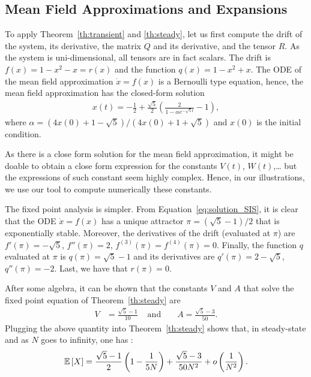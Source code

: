 \documentclass[sigconf]{acmart}
\newcommand\esp[1]{{\mathchoice{\besp{#1}}{\sesp{#1}}{\sesp{#1}}{\sesp{#1}}}}
\newcommand\besp[1]{\mathbb{E}\left[#1\right]}
\newcommand\sesp[1]{\mathbb{E}[#1]}
\newcommand\p[1]{\left(#1\right)}
\begin{document}
\subsection{Mean Field Approximations and Expansions}

To apply Theorem~\ref{th:transient} and \ref{th:steady}, let us first
compute the drift of the system, its derivative, the matrix $Q$
and its derivative, and the tensor $R$. As the system is
uni-dimensional, all tensors are in fact scalars. The drift is
$f(x)=1-x^2-x=r(x)$ and the function $q(x)=1-x^2+x$. The ODE of the
mean field approximation $\dot{x}=f(x)$ is a Bernoulli type equation,
hence, the mean field approximation has the closed-form solution
\begin{align}
  \label{eq:solution_SIS}
  x(t)=-\frac12+\frac{\sqrt{5}}{2}\p{\frac2{1-\alpha e^{-\sqrt{5}t}}-1},
\end{align}
where $\alpha=(4x(0)+1-\sqrt{5})/(4x(0)+1+\sqrt{5})$ and $x(0)$ is the initial condition.

As there is a close form solution for the mean field approximation, it
might be doable to obtain a close form expression for the constants
$V(t)$, $W(t)$,\dots{} but the expressions of such constant seem
highly complex. Hence, in our illustrations, we use our tool
\cite{rmfTool2018} to compute numerically these constants. 


The fixed point analysis is simpler.  From
Equation~\eqref{eq:solution_SIS}, it is clear that the ODE
$\dot{x}=f(x)$ has a unique attractor $\pi=(\sqrt{5}-1)/2$ that is
exponentially stable. Moreover, the derivatives of the drift (evaluated
at $\pi$) are $f'(\pi)=-\sqrt{5}$, $f''(\pi)=2$,
$f^{(3)}(\pi)=f^{(4)}(\pi)=0$. Finally, the function $q$ evaluated at
$\pi$ is $q(\pi)=\sqrt{5}-1$ and its derivatives are
$q'(\pi)=2-\sqrt{5}$, $q''(\pi)=-2$. Last, we have that $r(\pi)=0$.

After some algebra, it can be shown that the constants $V$ and $A$
that solve the fixed point equation of Theorem~\ref{th:steady} are
\begin{align*}
  V &= \frac{\sqrt{5}-1}{10}& \text{ and }
  & &A = \frac{\sqrt{5}-3}{50}. 
\end{align*}
Plugging the above quantity into Theorem~\ref{th:steady} shows that,
in steady-state and as $N$ goes to infinity, one has :
\begin{align*}
  \esp{X} = \frac{\sqrt{5}-1}{2} \p{1-\frac{1}{5N}} +
  \frac{\sqrt{5}-3}{50N^2} + o\p{\frac1{N^2}}.
\end{align*}
\end{document}
